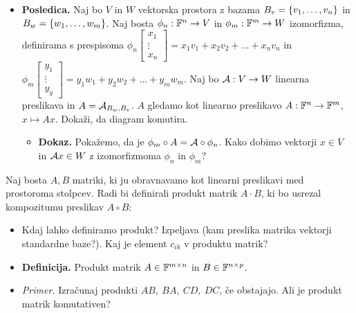 \begin{enumerate}
\begin{itemize}
        \item \colorbox{orange!30}{\textbf{Posledica.}} Naj bo $V$ in $W$ vektorska prostora z bazama $B_v = \left\{v_1, \ldots, v_n\right\}$ in $B_w = \left\{w_1, \ldots, w_m\right\}$. Naj bosta $\phi_n: \mathbb{F}^n \to V$ in $\phi_m: \mathbb{F}^m \to W$ izomorfizma, definirama s prespisoma $\phi_n \begin{bmatrix}
            x_1 \\ \vdots \\ x_n
        \end{bmatrix} = x_1 v_1 + x_2 v_2 + \ldots + x_n v_n$ in $\phi_m \begin{bmatrix}
            y_1 \\ \vdots \\ y_y
        \end{bmatrix} = y_1 w_1 + y_2 w_2 + \ldots + y_m w_m$. Naj bo $\mathcal{A}: V \to W$ linearna preslikava in $A = \mathcal{A}_{B_w, B_v}$. $A$ gledamo kot linearno preslikavo $A: \mathbb{F}^n \to \mathbb{F}^m$, $x \mapsto Ax$. Dokaži, da diagram     
              komutira.  
        \begin{itemize}
            \item \colorbox{green!30}{\textbf{Dokaz.}} Pokažemo, da je $\phi_m \circ A = \mathcal{A} \circ \phi_n$. Kako dobimo vektorji $x \in V$ in $\mathcal{A} x \in W$ z izomorfizmoma $\phi_n$ in $\phi_m$?
        \end{itemize}        
    \end{itemize}    
    Naj bosta $A, B$ matriki, ki ju obravnavamo kot linearni preslikavi med prostoroma stolpcev. Radi bi definirali produkt matrik $A \cdot B$, ki bo usrezal kompozitumu preslikav $A \circ B$:
    \begin{itemize}
        \item Kdaj lahko definiramo produkt? Izpeljava (kam preslika matrika vektorji standardne baze?). Kaj je element $c_{ik}$ v produktu matrik?
        \item \colorbox{purple!30}{\textbf{Definicija.}} Produkt matrik $A \in \mathbb{F}^{m \times n}$ in $B \in \mathbb{F}^{n \times p}$.
        \item \colorbox{yellow!30}{\emph{Primer.}} Izračunaj produkti $AB, \ BA, \ CD, \ DC$, če obstajajo. Ali je produkt matrik komutativen?
        

\end{itemize}
\end{enumerate}
